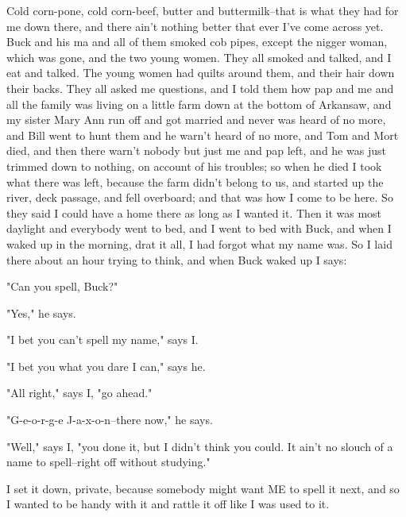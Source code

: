 Cold corn-pone, cold corn-beef, butter and buttermilk--that is what they
had for me down there, and there ain't nothing better that ever I've come
across yet.  Buck and his ma and all of them smoked cob pipes, except the
nigger woman, which was gone, and the two young women.  They all smoked
and talked, and I eat and talked.  The young women had quilts around
them, and their hair down their backs.  They all asked me questions, and
I told them how pap and me and all the family was living on a little farm
down at the bottom of Arkansaw, and my sister Mary Ann run off and got
married and never was heard of no more, and Bill went to hunt them and he
warn't heard of no more, and Tom and Mort died, and then there warn't
nobody but just me and pap left, and he was just trimmed down to nothing,
on account of his troubles; so when he died I took what there was left,
because the farm didn't belong to us, and started up the river, deck
passage, and fell overboard; and that was how I come to be here.  So they
said I could have a home there as long as I wanted it.  Then it was most
daylight and everybody went to bed, and I went to bed with Buck, and when
I waked up in the morning, drat it all, I had forgot what my name was.
So I laid there about an hour trying to think, and when Buck waked up I
says:

"Can you spell, Buck?"

"Yes," he says.

"I bet you can't spell my name," says I.

"I bet you what you dare I can," says he.

"All right," says I, "go ahead."

"G-e-o-r-g-e J-a-x-o-n--there now," he says.

"Well," says I, "you done it, but I didn't think you could.  It ain't no
slouch of a name to spell--right off without studying."

I set it down, private, because somebody might want ME to spell it next,
and so I wanted to be handy with it and rattle it off like I was used to
it.


